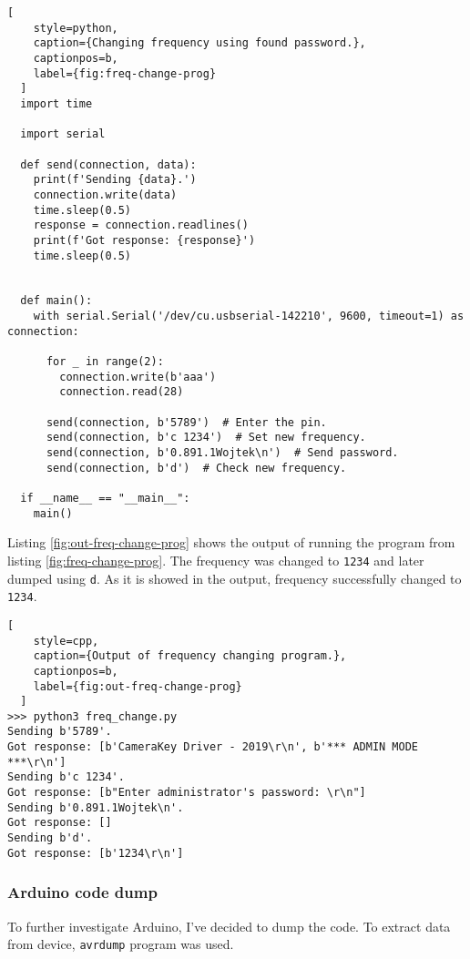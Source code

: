 \begin{minipage}{\linewidth}
  \begin{lstlisting}[
    style=python,
    caption={Changing frequency using found password.},
    captionpos=b,
    label={fig:freq-change-prog}
  ]
  import time

  import serial

  def send(connection, data):
    print(f'Sending {data}.')
    connection.write(data)
    time.sleep(0.5)
    response = connection.readlines()
    print(f'Got response: {response}')
    time.sleep(0.5)


  def main():
    with serial.Serial('/dev/cu.usbserial-142210', 9600, timeout=1) as connection:

      for _ in range(2):
        connection.write(b'aaa')
        connection.read(28)

      send(connection, b'5789')  # Enter the pin.
      send(connection, b'c 1234')  # Set new frequency.
      send(connection, b'0.891.1Wojtek\n')  # Send password.
      send(connection, b'd')  # Check new frequency.

  if __name__ == "__main__":
    main()
  \end{lstlisting}
\end{minipage}

Listing \ref{fig:out-freq-change-prog} shows the output of running the program from listing \ref{fig:freq-change-prog}. The frequency was changed to \texttt{1234} and later dumped using \texttt{d}. As it is showed in the output, frequency successfully changed to \texttt{1234}.

\begin{minipage}{\linewidth}
  \begin{lstlisting}[
    style=cpp,
    caption={Output of frequency changing program.},
    captionpos=b,
    label={fig:out-freq-change-prog}
  ]
>>> python3 freq_change.py
Sending b'5789'.
Got response: [b'CameraKey Driver - 2019\r\n', b'*** ADMIN MODE ***\r\n']
Sending b'c 1234'.
Got response: [b"Enter administrator's password: \r\n"]
Sending b'0.891.1Wojtek\n'.
Got response: []
Sending b'd'.
Got response: [b'1234\r\n']
  \end{lstlisting}
  \end{minipage}


\subsubsection{Arduino code dump}

To further investigate Arduino, I've decided to dump the code. To extract data from device, \texttt{avrdump} program was used.

